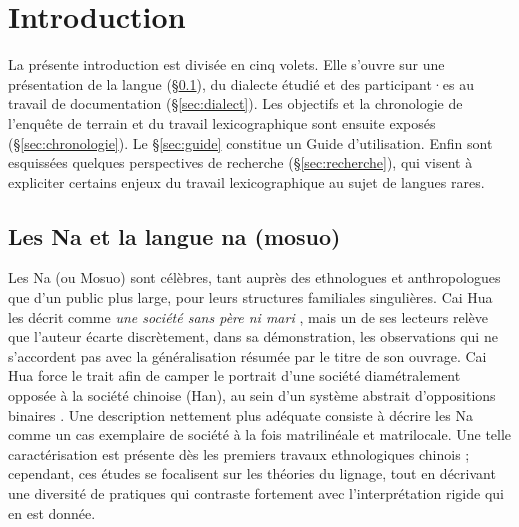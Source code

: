 
\languefra

\chapter*{Introduction}

La présente introduction est divisée en cinq volets. Elle s'ouvre sur une présentation de la langue (§\ref{sec:lang}), du dialecte étudié et des participant·es au travail de documentation (§\ref{sec:dialect}). Les objectifs et la chronologie de l'enquête de terrain et du travail lexicographique sont ensuite exposés (§\ref{sec:chronologie}). Le §\ref{sec:guide} constitue un Guide d'utilisation. Enfin sont esquissées quelques perspectives de recherche (§\ref{sec:recherche}), qui visent à expliciter certains enjeux du travail lexicographique au sujet de langues rares.


\section{Les Na et la langue na (mosuo)}
\label{sec:lang}

Les Na (ou Mosuo) sont célèbres, tant auprès des ethnologues et anthropologues que d’un public plus large, pour leurs structures familiales singulières. Cai Hua les décrit comme \emph{une société sans père ni mari} \parencite{cai1997}, mais un de ses lecteurs \parencite[147]{wellens2003} relève que l'auteur écarte discrètement, dans sa démonstration, les observations qui ne s'accordent pas avec la généralisation résumée par le titre de son ouvrage. Cai Hua force le trait afin de camper le portrait d'une société diamétralement opposée à la société chinoise (Han), au sein d'un système abstrait d'oppositions binaires \parencite{cai2008}. Une description nettement plus adéquate consiste à décrire les Na comme un cas exemplaire de société à la fois matrilinéale et matrilocale. Une telle caractérisation est présente dès les premiers travaux ethnologiques chinois \parencite{zhanetal1980,yanetal1983,weng1993,shih1993,shih2010}; cependant, ces études se focalisent sur les théories du lignage, tout en décrivant une diversité de pratiques qui contraste fortement avec l'interprétation rigide qui en est donnée.


